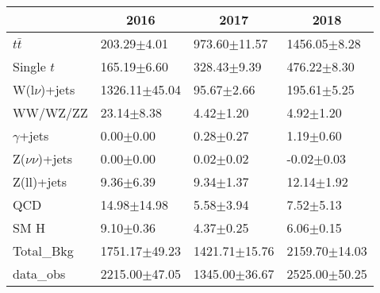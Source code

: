 \documentclass{article}
\begin{document}
\begin{table}[]
{\begin{tabular}{|l|l|l|l|}
\begin{table}[]
\centering
\caption{Background yield for W $(e\nu)$ CR (1b)}
\label{tab:WenuCR1b}
\resizebox{0.8\textwidth}{!}{
\begin{tabular}{|l|l|l|l|}
\hline
\multicolumn{1}{|c|}{\textbf{}} & \multicolumn{1}{c|}{\textbf{2016}} & \multicolumn{1}{c|}{\textbf{2017}} & \multicolumn{1}{c|}{\textbf{2018}} \\ \hline
$t\bar{t}$ & 203.29$\pm$4.01 & 973.60$\pm$11.57 & 1456.05$\pm$8.28 \\ \hline
Single $t$ & 165.19$\pm$6.60 & 328.43$\pm$9.39 & 476.22$\pm$8.30 \\ \hline
W(l$\nu$)+jets & 1326.11$\pm$45.04 & 95.67$\pm$2.66 & 195.61$\pm$5.25 \\ \hline
WW/WZ/ZZ & 23.14$\pm$8.38 & 4.42$\pm$1.20 & 4.92$\pm$1.20 \\ \hline
$\gamma$+jets & 0.00$\pm$0.00 & 0.28$\pm$0.27 & 1.19$\pm$0.60 \\ \hline
Z($\nu\nu$)+jets & 0.00$\pm$0.00 & 0.02$\pm$0.02 & -0.02$\pm$0.03 \\ \hline
Z(ll)+jets & 9.36$\pm$6.39 & 9.34$\pm$1.37 & 12.14$\pm$1.92 \\ \hline
QCD & 14.98$\pm$14.98 & 5.58$\pm$3.94 & 7.52$\pm$5.13 \\ \hline
SM H & 9.10$\pm$0.36 & 4.37$\pm$0.25 & 6.06$\pm$0.15 \\ \hline
Total\_Bkg & 1751.17$\pm$49.23 & 1421.71$\pm$15.76 & 2159.70$\pm$14.03 \\ \hline
data\_obs & 2215.00$\pm$47.05 & 1345.00$\pm$36.67 & 2525.00$\pm$50.25 \\ \hline

\end{tabular}
}
\end{table}
\end{document}
